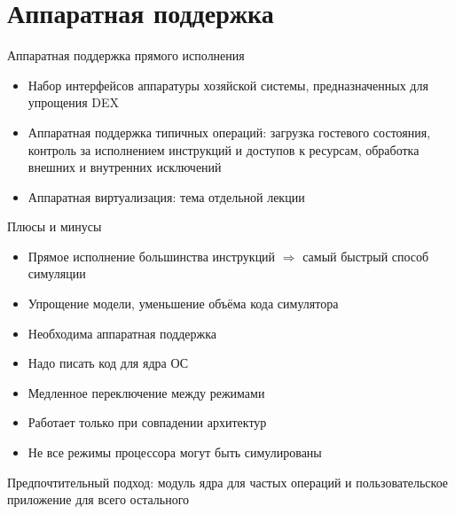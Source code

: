 \documentclass{beamer}
\begin{document}
\section{Аппаратная поддержка}

\begin{frame}{Аппаратная поддержка прямого исполнения}
\begin{itemize}
    \item Набор интерфейсов аппаратуры хозяйской системы, предназначенных для упрощения DEX
    \item Аппаратная поддержка типичных операций: загрузка гостевого состояния, контроль за исполнением инструкций и доступов к ресурсам, обработка внешних и внутренних исключений
    \item Аппаратная виртуализация: тема отдельной лекции
\end{itemize}
\end{frame}

\begin{frame}{Плюсы и минусы}
\begin{itemize}
    \item Прямое исполнение большинства инструкций $\Rightarrow$ самый быстрый способ симуляции
    \item Упрощение модели, уменьшение объёма кода симулятора
\end{itemize}

\begin{itemize}
    \item Необходима аппаратная поддержка
    \item Надо писать код для ядра ОС
    \item Медленное переключение между режимами %
    \item Работает только при совпадении архитектур
    \item Не все режимы процессора могут быть симулированы
\end{itemize}

Предпочтительный подход: модуль ядра для частых операций и пользовательское приложение для всего остального

\end{frame}
\end{document}
